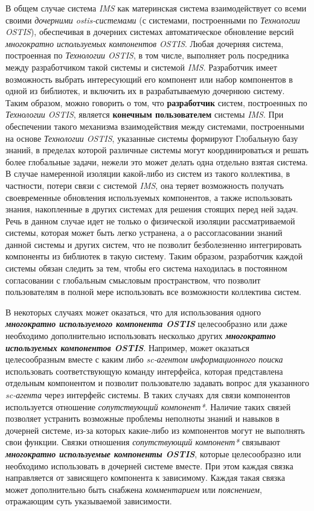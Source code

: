 \begin{SCn}
{В общем случае система \textit{IMS} как материнская система взаимодействует со всеми своими \textit{дочерними ostis-системами} (с системами, построенными по \textit{Технологии OSTIS}), обеспечивая в дочерних системах автоматическое обновление версий \textit{многократно используемых компонентов OSTIS}. Любая дочерняя система, построенная по \textit{Технологии OSTIS}, в том числе, выполняет роль посредника между разработчиком такой системы и системой \textit{IMS}. Разработчик имеет возможность выбрать интересующий его компонент или набор компонентов в одной из библиотек, и включить их в разрабатываемую дочернюю систему. Таким образом, можно говорить о том, что \textbf{разработчик} систем, построенных по \textit{Технологии OSTIS}, является \textbf{конечным пользователем} системы \textit{IMS}. При обеспечении такого механизма взаимодействия между системами, построенными на основе \textit{Технологии OSTIS}, указанные системы формируют Глобальную базу знаний, в пределах которой различные системы могут координироваться и решать более глобальные задачи, нежели это может делать одна отдельно взятая система. В случае намеренной изоляции какой-либо из систем из такого коллектива, в частности, потери связи с системой \textit{IMS}, она теряет возможность получать своевременные обновления используемых компонентов, а также использовать знания, накопленные в других системах для решения стоящих перед ней задач. Речь в данном случае идет не только о физической изоляции рассматриваемой системы, которая может быть легко устранена, а о рассогласовании знаний данной системы и других систем, что не позволит безболезненно интегрировать компоненты из библиотек в такую систему. Таким образом, разработчик каждой системы обязан следить за тем, чтобы его система находилась в постоянном согласовании с глобальным смысловым пространством, что позволит пользователям в полной мере использовать все возможности коллектива систем.

В некоторых случаях может оказаться, что для использования одного \textbf{\textit{многократно используемого компонента OSTIS}} целесообразно или даже необходимо дополнительно использовать несколько других \textbf{\textit{многократно используемых компонентов OSTIS}}. Например, может оказаться целесообразным вместе с каким либо \textit{sc-агентом информационного поиска} использовать соответствующую команду интерфейса, которая представлена отдельным компонентом и позволит пользователю задавать вопрос для указанного \textit{sc-агента} через интерфейс системы. В таких случаях для связи компонентов используется отношение \textit{сопутствующий компонент*}. Наличие таких связей позволяет устранить возможные проблемы неполноты знаний и навыков в дочерней системе, из-за которых какие-либо из компонентов могут не выполнять свои функции. Связки отношения \textit{сопутствующий компонент*} связывают \textbf{\textit{многократно используемые компоненты OSTIS}}, которые целесообразно или необходимо использовать в дочерней системе вместе. При этом каждая связка направляется от зависящего компонента к зависимому. Каждая такая связка может дополнительно быть снабжена \textit{комментарием} или \textit{пояснением}, отражающим суть указываемой зависимости.

}
\end{SCn}
